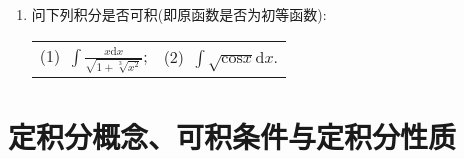 \begin{enumerate}
\begin{table}[H]
\begin{tabular}{ll}
		(3)\ $\int \sqrt{x^2+\frac{1}{x^2}}\mathrm{d}x$;\qquad \qquad \qquad \qquad &(4)\ $\int \frac{\mathrm{d}x}{x+\sqrt{x^2-x+1}}$.
	\end{tabular}
\end{table}
\item 问下列积分是否可积(即原函数是否为初等函数):
\begin{table}[H]
	\begin{tabular}{ll}
		(1)\ $\int \frac{x\mathrm{d}x}{\sqrt{1+\sqrt[3]{x^2}}}$;\qquad \qquad \qquad \qquad &(2)\ $\int \sqrt{\mathrm{cos}x}\mathrm{d}x$.
	\end{tabular}
\end{table}
\end{enumerate}
\section{定积分概念、可积条件与定积分性质}
